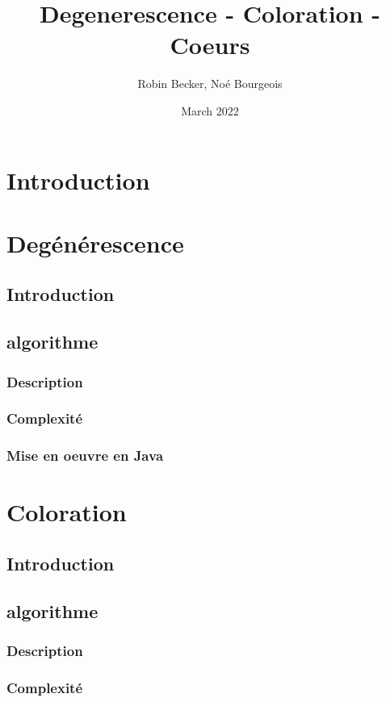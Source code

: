 \documentclass{article}
\title{Degenerescence - Coloration - Coeurs}
\author{Robin Becker, Noé Bourgeois }
\date{March 2022}
\begin{document}
\maketitle
\tableofcontents
\newpage

\section{Introduction}

\newpage

\section{Degénérescence}
\subsection{Introduction}
\subsection{algorithme}
\subsubsection{Description}
\subsubsection{Complexité}
\subsubsection{Mise en oeuvre en Java }

\newpage

\section{Coloration}
\subsection{Introduction}
\subsection{algorithme}
\subsubsection{Description}
\subsubsection{Complexité}
\end{document}
